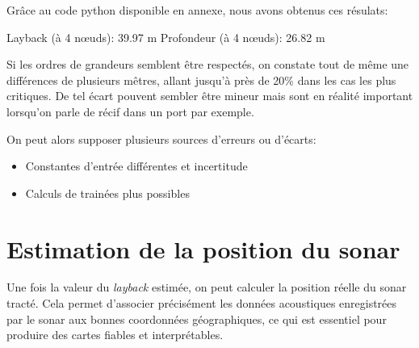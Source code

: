 \documentclass[12pt,a4paper]{report}
\begin{document}
Grâce au code python disponible en annexe, nous avons obtenus ces résulats:

Layback (à 4 nœuds): 39.97 m
Profondeur (à 4 nœuds): 26.82 m

Si les ordres de grandeurs semblent être respectés, on constate tout de même une différences de plusieurs mêtres,
allant jusqu'à près de 20\% dans les cas les plus critiques.
De tel écart pouvent sembler être mineur mais sont en réalité important lorsqu'on parle de récif dans un port par exemple.

On peut alors supposer plusieurs sources d'erreurs ou d'écarts:
\begin{itemize}
  \item Constantes d'entrée différentes et incertitude
  \item Calculs de trainées plus possibles
\end{itemize}


\section{Estimation de la position du sonar}
\begin{figure}[H]
\end{figure}

Une fois la valeur du \textit{layback} estimée, on peut calculer la position réelle du sonar tracté. Cela permet
d’associer précisément les données acoustiques enregistrées par le sonar aux bonnes coordonnées géographiques, ce qui
est essentiel pour produire des cartes fiables et interprétables.
\end{document}

